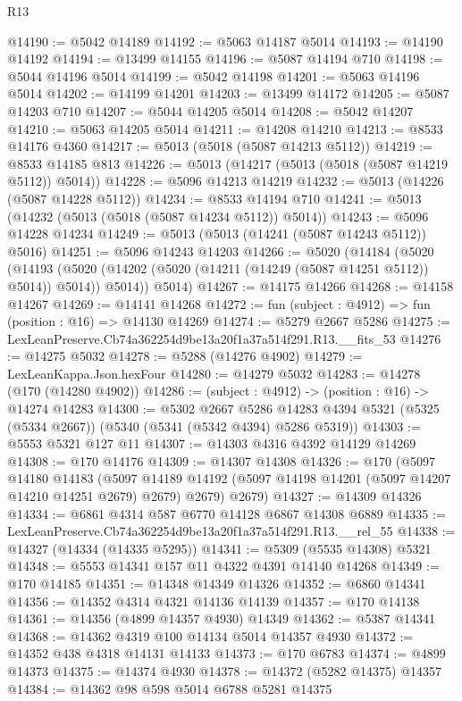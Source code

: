\begin{lexlean}{R13}
\begin{coremodule}
@14190 := @5042 @14189
@14192 := @5063 @14187 @5014
@14193 := @14190 @14192
@14194 := @13499 @14155
@14196 := @5087 @14194 @710
@14198 := @5044 @14196 @5014
@14199 := @5042 @14198
@14201 := @5063 @14196 @5014
@14202 := @14199 @14201
@14203 := @13499 @14172
@14205 := @5087 @14203 @710
@14207 := @5044 @14205 @5014
@14208 := @5042 @14207
@14210 := @5063 @14205 @5014
@14211 := @14208 @14210
@14213 := @8533 @14176 @4360
@14217 := @5013 (@5018 (@5087 @14213 @5112))
@14219 := @8533 @14185 @813
@14226 := @5013 (@14217 (@5013 (@5018 (@5087 @14219 @5112)) @5014))
@14228 := @5096 @14213 @14219
@14232 := @5013 (@14226 (@5087 @14228 @5112))
@14234 := @8533 @14194 @710
@14241 := @5013 (@14232 (@5013 (@5018 (@5087 @14234 @5112)) @5014))
@14243 := @5096 @14228 @14234
@14249 := @5013 (@5013 (@14241 (@5087 @14243 @5112)) @5016)
@14251 := @5096 @14243 @14203
@14266 := @5020
    (@14184
      (@5020
        (@14193 (@5020 (@14202 (@5020 (@14211 (@14249 (@5087 @14251 @5112)) @5014)) @5014)) @5014))
      @5014)
@14267 := @14175 @14266
@14268 := @14158 @14267
@14269 := @14141 @14268
@14272 := fun (subject : @4912) => fun (position : @16) => @14130 @14269
@14274 := @5279 @2667 @5286
@14275 := LexLeanPreserve.Cb74a362254d9be13a20f1a37a514f291.R13.__fits_53
@14276 := @14275 @5032
@14278 := @5288 (@14276 @4902)
@14279 := LexLeanKappa.Json.hexFour
@14280 := @14279 @5032
@14283 := @14278 (@170 (@14280 @4902))
@14286 := (subject : @4912) -> (position : @16) -> @14274 @14283
@14300 := @5302
    @2667
    @5286
    @14283
    @4394
    @5321
    (@5325 (@5334 @2667))
    (@5340 (@5341 (@5342 @4394) @5286 @5319))
@14303 := @5553 @5321 @127 @11
@14307 := @14303 @4316 @4392 @14129 @14269
@14308 := @170 @14176
@14309 := @14307 @14308
@14326 := @170
    (@5097
      @14180
      @14183
      (@5097 @14189 @14192 (@5097 @14198 @14201 (@5097 @14207 @14210 @14251 @2679) @2679) @2679)
      @2679)
@14327 := @14309 @14326
@14334 := @6861 @4314 @587 @6770 @14128 @6867 @14308 @6889
@14335 := LexLeanPreserve.Cb74a362254d9be13a20f1a37a514f291.R13.__rel_55
@14338 := @14327 (@14334 (@14335 @5295))
@14341 := @5309 (@5535 @14308) @5321
@14348 := @5553 @14341 @157 @11 @4322 @4391 @14140 @14268
@14349 := @170 @14185
@14351 := @14348 @14349 @14326
@14352 := @6860 @14341
@14356 := @14352 @4314 @4321 @14136 @14139
@14357 := @170 @14138
@14361 := @14356 (@4899 @14357 @4930) @14349
@14362 := @5387 @14341
@14368 := @14362 @4319 @100 @14134 @5014 @14357 @4930
@14372 := @14352 @438 @4318 @14131 @14133
@14373 := @170 @6783
@14374 := @4899 @14373
@14375 := @14374 @4930
@14378 := @14372 (@5282 @14375) @14357
@14384 := @14362 @98 @598 @5014 @6788 @5281 @14375

\end{coremodule}
\end{lexlean}
